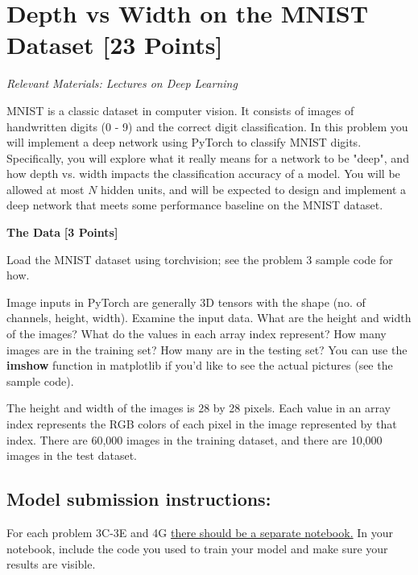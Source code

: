 
\newpage
\section{Depth vs Width on the MNIST Dataset  [23 Points]}

\textit{Relevant Materials: Lectures on Deep Learning}

MNIST is a classic dataset in computer vision. It consists of images of handwritten digits (0 - 9) and the correct digit classification. In this problem you will implement a deep network using PyTorch to classify MNIST digits. Specifically, you will explore what it really means for a network to be "deep", and how depth vs. width impacts the classification accuracy of a model. You will be allowed at most $N$ hidden units, and will be expected to design and implement a deep network that meets some performance baseline on the MNIST dataset.

\medskip

\problem \textbf{The Data} \textbf{[3 Points]}

Load the MNIST dataset using torchvision; see the problem 3 sample code for how.

Image inputs in PyTorch are generally 3D tensors with the shape (no. of channels, height, width). Examine the input data. What are the height and width of the images? What do the values in each array index represent?  How many images are in the training set? How many are in the testing set? You can use the \textbf{imshow} function in matplotlib if you'd like to see the actual pictures (see the sample code).

\begin{subsolution}
  The height and width of the images is 28 by 28 pixels. Each value in an array index represents the RGB colors of each pixel in the image represented by that index. There are 60,000 images in the training dataset, and there are 10,000 images in the test dataset.
\end{subsolution}

\subsection{Model submission instructions: }
For each problem 3C-3E and 4G \underline{there should be a separate notebook.} In your notebook, include the code you used to train your model and make sure your results are visible.

